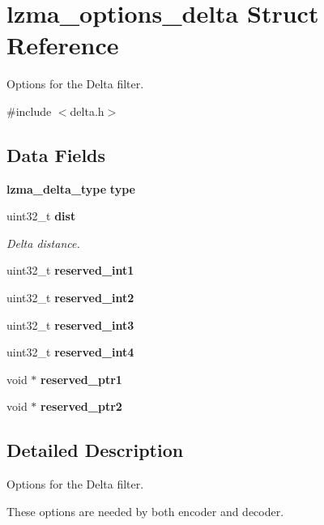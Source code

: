 \section{lzma\+\_\+options\+\_\+delta Struct Reference}
\label{structlzma__options__delta}


Options for the Delta filter.  




{\ttfamily \#include $<$delta.\+h$>$}

\subsection*{Data Fields}
\begin{DoxyCompactItemize}
\item 
\textbf{ lzma\+\_\+delta\+\_\+type} \textbf{ type}
\item 
uint32\+\_\+t \textbf{ dist}
\begin{DoxyCompactList}\small\item\em Delta distance. \end{DoxyCompactList}\item 
\mbox{\label{structlzma__options__delta_abbe5fee79483b461fa4f1927f41e9158}} 
uint32\+\_\+t {\bfseries reserved\+\_\+int1}
\item 
\mbox{\label{structlzma__options__delta_a3058d5a85518e40b8e3ed7d5e64527ec}} 
uint32\+\_\+t {\bfseries reserved\+\_\+int2}
\item 
\mbox{\label{structlzma__options__delta_a01e600ee62cd1e82e353c7c8adbe23ea}} 
uint32\+\_\+t {\bfseries reserved\+\_\+int3}
\item 
\mbox{\label{structlzma__options__delta_a3c34fcc33c70e225996a34621ab28828}} 
uint32\+\_\+t {\bfseries reserved\+\_\+int4}
\item 
\mbox{\label{structlzma__options__delta_ad3ffc87036cd62596f384d642e1e5f4d}} 
void $\ast$ {\bfseries reserved\+\_\+ptr1}
\item 
\mbox{\label{structlzma__options__delta_ac2cf28cd8660b13324802badf4b0f1f0}} 
void $\ast$ {\bfseries reserved\+\_\+ptr2}
\end{DoxyCompactItemize}


\subsection{Detailed Description}
Options for the Delta filter. 

These options are needed by both encoder and decoder. 

